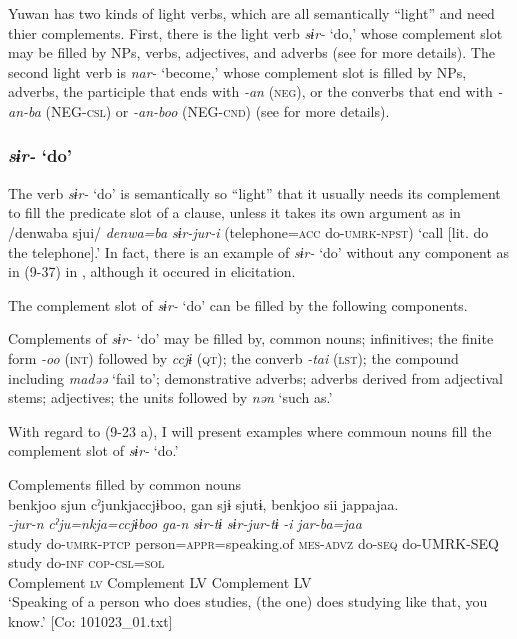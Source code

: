 Yuwan has two kinds of light verbs, which are all semantically “light” and need thier complements. First, there is the light verb \textit{sɨr-} ‘do,’ whose complement slot may be filled by NPs, verbs, adjectives, and adverbs (see  for more details). The second light verb is \textit{nar-} ‘become,’ whose complement slot is filled by NPs, adverbs, the participle that ends with \textit{{}-an} (\textsc{neg}), or the converbs that end with \textit{{}-an-ba} (NEG-\textsc{csl}) or \textit{{}-an-boo} (NEG-\textsc{cnd}) (see  for more details).

\subsubsection{\textit{sɨr-} ‘do’}\label{sec:9.1.2.1}

The verb \textit{sɨr-} ‘do’ is semantically so “light” that it usually needs its complement to fill the predicate slot of a clause, unless it takes its own argument as in /denwaba sjui/ \textit{denwa=ba} \textit{sɨr-jur-i} (telephone=\textsc{acc} do-\textsc{umrk}-\textsc{npst}) ‘call [lit. do the telephone].’ In fact, there is an example of \textit{sɨr-} ‘do’ without any component as in (9-37) in , although it occured in elicitation.

The complement slot of \textit{sɨr-} ‘do’ can be filled by the following components.

\ea  Complements of \textit{sɨr-} ‘do’ may be filled by, \label{ex:9.23}
  \ea  common nouns;
  \ex  infinitives;
  \ex  the finite form \textit{{}-oo} (\textsc{int}) followed by \textit{ccjɨ} (\textsc{qt});
  \ex  the converb \textit{{}-tai} (\textsc{lst});
  \ex  the compound including \textit{madəə} ‘fail to’;
  \ex  demonstrative adverbs;
  \ex  adverbs derived from adjectival stems;
  \ex  adjectives;
  \ex  the units followed by \textit{nən} ‘such as.’
  \z
\z

With regard to (9-23 a), I will present examples where commoun nouns fill the complement slot of \textit{sɨr-} ‘do.’

\ea   Complements filled by common nouns \label{ex:9.24}
\ea{}\\
 \gllll    {\textbar}benkjoo{\textbar}  sjun  cˀjunkjaccjɨboo,  gan  sjɨ  sjutɨ,  {\textbar}benkjoo{\textbar}  sii  jappajaa.\\
      \textit{}  \textit{-jur-n}  \textit{cˀju=nkja=ccjɨboo}  \textit{ga-n}   \textit{sɨr-tɨ}  \textit{sɨr-jur-tɨ}  \textit{}  \textit{-i}  \textit{jar-ba=jaa}\\
      study  do-\textsc{umrk}-\textsc{ptcp}  person=\textsc{appr}=speaking.of  \textsc{mes}-\textsc{advz}  do-\textsc{seq}  do-UMRK-SEQ  study  do-\textsc{inf}  \textsc{cop}-\textsc{csl}=\textsc{sol}\\
      Complement  \textsc{lv}  {}  Complement LV  {}  Complement  LV  {}\\
      \glt       ‘Speaking of a person who does studies, (the one) does studying like that, you know.’ [Co: 101023\_01.txt]

